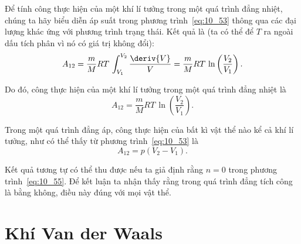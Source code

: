 
Để tính công thực hiện của một khí lí tưởng trong một quá trình đẳng nhiệt, chúng ta hãy biểu diễn áp suất trong phương trình~\eqref{eq:10_53} thông qua các đại lượng khác ứng với phương trình trạng thái. Kết quả là (ta có thể để $T$ ra ngoài dấu tích phân vì nó có giá trị không đổi): 
\begin{equation*}
	A_{12} = \frac{m}{M}RT\, \int_{V_1}^{V_2} \frac{\deriv{V}}{V} = \frac{m}{M} RT\,\ln\left(\frac{V_2}{V_1}\right).
\end{equation*}

\noindent

Do đó, công thực hiện của một khí lí tưởng trong một quá trình đẳng nhiệt là 
\begin{equation}\label{eq:10_60}
	A_{12} = \frac{m}{M} RT\,\ln\left(\frac{V_2}{V_1}\right).
\end{equation}


Trong một quá trình đẳng áp, công thực hiện của bất kì vật thể nào kể cả khí lí tưởng, như có thể thấy từ phương trình~\eqref{eq:10_53} là 
\begin{equation}\label{eq:10_61}
	A_{12} = p(V_2 - V_1).
\end{equation}

\noindent

Kết quả tương tự có thể thu được nếu ta giả định rằng $n=0$ trong phương trình~\eqref{eq:10_55}. Để kết luận ta nhận thấy rằng trong quá trình đẳng tích công là bằng không, điều này đúng với mọi vật thể.


\section{Khí Van der Waals}\label{sec:10_13}


